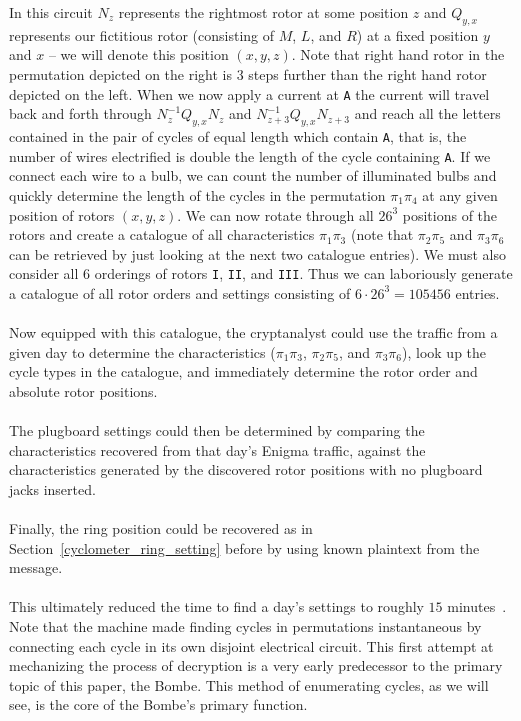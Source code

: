 \noindent In this circuit $N_z$ represents the rightmost rotor at some position
$z$ and $Q_{y,x}$ represents our fictitious rotor (consisting of $M$,
$L$, and $R$) at a fixed position $y$ and $x$ -- we will denote this
position $(x,y,z)$. Note that right hand
rotor in the permutation depicted on the right is 3 steps further
than the right hand rotor depicted on the left. When we now apply a
current at \texttt{A} the current will travel back and forth through
$N^{-1}_zQ_{y,x}N_z$ and $N^{-1}_{z+3}Q_{y,x}N_{z+3}$ and reach all
the letters contained
in the pair of cycles of equal length which contain \texttt{A}, that
is, the number of wires electrified is double the length of the cycle
containing \texttt{A}. If we connect each wire to a bulb, we can
count the number of illuminated bulbs and quickly determine the length of
the cycles in the permutation $\pi_1\pi_{4}$ at any given
position of rotors $(x,y,z)$. We can now rotate through all
$26^3$ positions of the rotors and create a catalogue of all
characteristics $\pi_1\pi_3$ (note that $\pi_2\pi_5$ and
  $\pi_3\pi_6$ can be retrieved by just looking at the next two
catalogue entries). We must also consider all 6 orderings of rotors
\texttt{I}, \texttt{II}, and \texttt{III}. Thus we can laboriously
generate a catalogue of all rotor orders and settings consisting of
$6\cdot 26^3 = 105456$ entries.
\\\\Now equipped with this catalogue, the cryptanalyst could use the
traffic from a given day to determine the characteristics
($\pi_1\pi_3$, $\pi_2\pi_5$, and $\pi_3\pi_6$), look up
the cycle types in the catalogue, and immediately determine the rotor order and
absolute rotor positions.
\\\\The plugboard settings could then be
determined by comparing the characteristics recovered from that day's Enigma
traffic, against the characteristics generated by the discovered rotor
positions with no plugboard jacks inserted.
\\\\Finally, the ring position
could be recovered as in Section~\ref{cyclometer_ring_setting} before
by using known plaintext from
the message.
\\\\This ultimately reduced the time to find a day's
settings to roughly $15$ minutes~\cite[p.~225]{Rejewski1981}. Note that the machine made finding
cycles in permutations
instantaneous by connecting each cycle in its own disjoint electrical
circuit. This first attempt at mechanizing the process of decryption
is a very early predecessor to the primary topic of this paper, the
Bombe. This method of enumerating cycles, as we will see, is the core
of the Bombe's primary function.
